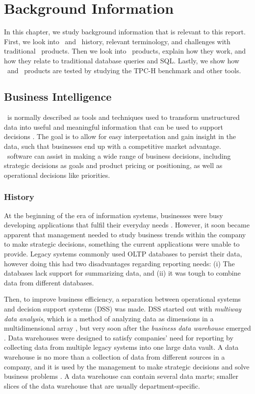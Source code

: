 \chapter{Background Information}
\label{chap:Background Information}
In this chapter, we study background information that is relevant to this report. First, we look into \bi~and \bi~history, relevant terminology, and challenges with traditional \bi~products. Then we look into \bd~products, explain how they work, and how they relate to traditional database queries and SQL. Lastly, we show how \bi~and \bd~products are tested by studying the TPC-H benchmark and other tools.

\clearpage

\section{Business Intelligence}
\label{sec:Business Intelligence}
\bi~is normally described as tools and techniques used to transform unstructured data into useful and meaningful information that can be used to support decisions \cite{Wikipedia_contributors2015-ag}. The goal is to allow for easy interpretation and gain insight in the data, such that businesses end up with a competitive market advantage. \bi~software can assist in making a wide range of business decisions, including strategic decisions as goals and product pricing or positioning, as well as operational decisions like priorities.

\subsection{History}
\label{sub:History}
At the beginning of the era of information systems, businesses were busy developing applications that fulfil their everyday needs \cite{Pavlic2002-nm}. However, it soon became apparent that management needed to study business trends within the company to make strategic decisions, something the current applications were unable to provide. Legacy systems commonly used OLTP databases to persist their data, however doing this had two disadvantages regarding reporting needs: (i) The databases lack support for summarizing data, and (ii) it was tough to combine data from different databases.

Then, to improve business efficiency, a separation between operational systems and decision support systems (DSS) was made. DSS started out with \textit{multiway data analysis}, which is a method of analyzing data as dimensions in a multidimensional array \cite{Wikipedia_contributors2015-zu}, but very soon after the \textit{business data warehouse} emerged \cite{Devlin1988-yu}. Data warehouses were designed to satisfy companies' need for reporting by collecting data from multiple legacy systems into one large data vault. A data warehouse is no more than a collection of data from different sources in a company, and it is used by the management to make strategic decisions and solve business problems \cite{Pavlic2002-nm}. A data warehouse can contain several data marts; smaller slices of the data warehouse that are usually department-specific.

